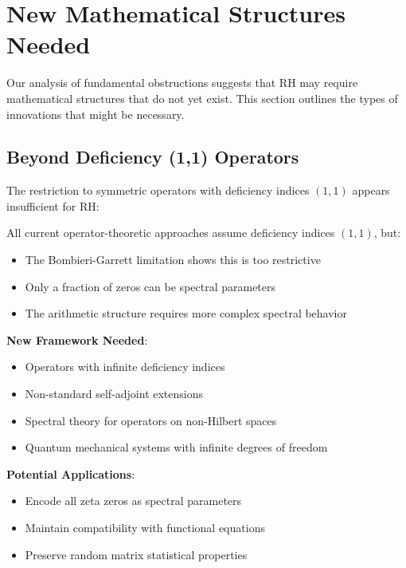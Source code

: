 \section{New Mathematical Structures Needed}
\label{sec:new_structures}

Our analysis of fundamental obstructions suggests that RH may require mathematical structures that do not yet exist. This section outlines the types of innovations that might be necessary.

\subsection{Beyond Deficiency (1,1) Operators}
\label{subsec:beyond_deficiency}

The restriction to symmetric operators with deficiency indices $(1,1)$ appears insufficient for RH:

\begin{problem}
All current operator-theoretic approaches assume deficiency indices $(1,1)$, but:
\begin{itemize}
\item The Bombieri-Garrett limitation shows this is too restrictive
\item Only a fraction of zeros can be spectral parameters
\item The arithmetic structure requires more complex spectral behavior
\end{itemize}
\end{problem}

\begin{research_direction}
\textbf{New Framework Needed}:
\begin{itemize}
\item Operators with infinite deficiency indices
\item Non-standard self-adjoint extensions
\item Spectral theory for operators on non-Hilbert spaces
\item Quantum mechanical systems with infinite degrees of freedom
\end{itemize}

\textbf{Potential Applications}:
\begin{itemize}
\item Encode all zeta zeros as spectral parameters
\item Maintain compatibility with functional equations
\item Preserve random matrix statistical properties
\end{itemize}
\end{research_direction}

